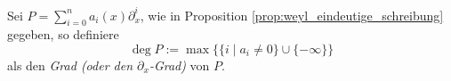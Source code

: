 \begin{comment}
Besser?:\\
erst Filtrierung definieren und dadurch dann den Grad?
\end{comment}
\begin{defn}
Sei $P=\sum_{i=0}^na_i(x)\partial_x^i$, wie in Proposition
\ref{prop:weyl_eindeutige_schreibung} gegeben, so definiere
\[
\deg P:=\max\Big\{\{i\mid a_i\neq 0\}\cup\{-\infty\}\Big\}
\]
als den \emph{Grad (oder den $\partial_x$-Grad)}
von $P$.
\end{defn}
\begin{comment}
In natürlicher Weise erhält man die aufsteigende Filtrierung
$F_N\cD:=\{P\in\cD|\deg P\leq N\}$ mit
\[
\cdots\subset F_{-1}\cD\subset F_{0}\cD\subset
F_{1}\cD\subset\cdots\subset\cD
\]
und erhalte $gr_k^F\cD\bydef F_N\cD\slash F_{N-1}\cD
=\{P\in\cD|\deg P=N\}\cong\C\{x\}$.

\begin{proof}[Beweisidee]
Sei $P\in F_N\cD$, so betrachte den Isomorphismus $F_N\cD\slash
F_{N-1}\cD\rightarrow \C\{x\}$ definiert durch $[P]=P+F_{N-1}\cD\mapsto
a_n(x)$.
\end{proof}

\begin{prop}
Es gilt:
\begin{center}
\begin{tikzpicture} [descr/.style={fill=white,inner sep=2.5pt}]
\matrix (m) [
  matrix of math nodes,
  row sep=1em,
  text height=1.5ex,
  text depth=0.25ex]
{
  gr^F\cD &
  := \bigoplus_{N\in\Z}gr_N^F\cD = \bigoplus_{N\in\N_0}gr_N^F\cD \cong
  \bigoplus_{N\in\N_0}\C\{x\} \cong \C\{x\}[\xi] = &
  \bigoplus_{N\in\N_0}\C\{x\}\cdot \xi^N \\
};
\path[solid]
(m-1-1) edge [bend right=15] node[descr]{$\cong$}
  node[below]{$\mbox{isomorph als grad. Ringe}$} (m-1-3);
\end{tikzpicture}
\end{center}
also $gr^F\cD \cong \bigoplus_{N\in\N_0}\C\{x\}\cdot \xi^N$ als gradierte
Ringe.
\end{prop}
\begin{proof}
TODO: Treffen?
\end{proof}
\end{comment}

